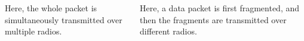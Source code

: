 \begin{columns}
    \begin{column}{0.5\textwidth}\centering
    
    \begin{center}
    Here, the whole packet is simultaneously transmitted over multiple radios.
    \end{center}
    \end{column}
    \begin{column}{0.5\textwidth}\centering
    
    \begin{center}
    Here, a data packet is first fragmented, and then the fragments are transmitted over different radios.
    \end{center}
    \end{column}
\end{columns}

